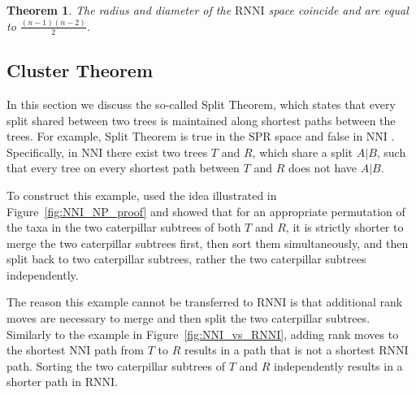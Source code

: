 \documentclass{amsart}
\newcommand{\nni}{\mathrm{NNI}}
\newcommand{\rnni}{\mathrm{RNNI}}
\newcommand{\spr}{\mathrm{SPR}}
\newtheorem{theorem}{Theorem}
\begin{document}
\begin{theorem}
The radius and diameter of the $\rnni$ space coincide and are equal to $\frac{(n-1)(n-2)}{2}$.
\label{thm:radius}
\end{theorem}


\subsection{Cluster Theorem}
\label{section:cluster_theorem}

In this section we discuss the so-called Split Theorem, which states that every split shared between two trees is maintained along shortest paths between the trees.
For example, Split Theorem is true in the $\spr$ space and false in $\nni$ \autocite{Li1996-zw}.
Specifically, in $\nni$ there exist two trees $T$ and $R$, which share a split $A | B$, such that every tree on every shortest path between $T$ and $R$ does not have $A | B$.

To construct this example, \textcite{Li1996-zw} used the idea illustrated in Figure~\ref{fig:NNI_NP_proof} and showed that for an appropriate permutation of the taxa in the two caterpillar subtrees of both $T$ and $R$, it is strictly shorter to merge the two caterpillar subtrees first, then sort them simultaneously, and then split back to two caterpillar subtrees, rather the two caterpillar subtrees independently.

The reason this example cannot be transferred to $\rnni$ is that additional rank moves are necessary to merge and then split the two caterpillar subtrees.
Similarly to the example in Figure~\ref{fig:NNI_vs_RNNI}, adding rank moves to the shortest $\nni$ path from $T$ to $R$ results in a path that is not a shortest $\rnni$ path.
Sorting the two caterpillar subtrees of $T$ and $R$ independently results in a shorter path in $\rnni$.
\end{document}
